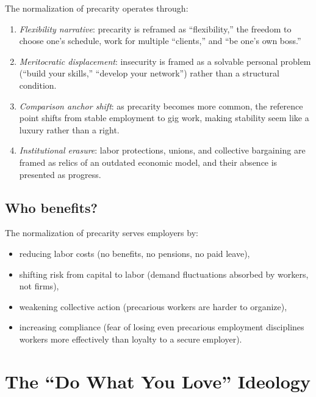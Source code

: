 \begin{model}
\label{mod:precarity}
The normalization of precarity operates through:
\begin{enumerate}[nosep]
  \item \emph{Flexibility narrative}: precarity is reframed as ``flexibility,'' the freedom to choose one's schedule, work for multiple ``clients,'' and ``be one's own boss.''
  \item \emph{Meritocratic displacement}: insecurity is framed as a solvable personal problem (``build your skills,'' ``develop your network'') rather than a structural condition.
  \item \emph{Comparison anchor shift}: as precarity becomes more common, the reference point shifts from stable employment to gig work, making stability seem like a luxury rather than a right.
  \item \emph{Institutional erasure}: labor protections, unions, and collective bargaining are framed as relics of an outdated economic model, and their absence is presented as progress.
\end{enumerate}
\end{model}

\subsection{Who benefits?}

The normalization of precarity serves employers by:
\begin{itemize}[nosep]
  \item reducing labor costs (no benefits, no pensions, no paid leave),
  \item shifting risk from capital to labor (demand fluctuations absorbed by workers, not firms),
  \item weakening collective action (precarious workers are harder to organize),
  \item increasing compliance (fear of losing even precarious employment disciplines workers more effectively than loyalty to a secure employer).
\end{itemize}

\section{The ``Do What You Love'' Ideology}
\label{sec:ch26-dwyl}

